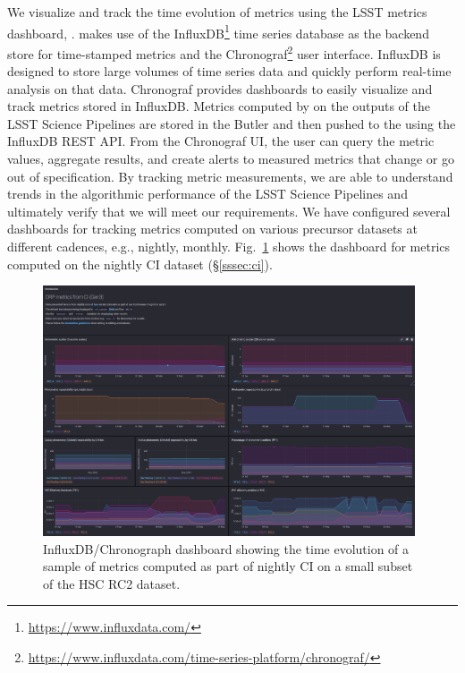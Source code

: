 We visualize and track the time evolution of \faro metrics using the LSST metrics dashboard, \squash\cite{SQR-009}.
\squash makes use of the InfluxDB\footnote{\url{https://www.influxdata.com/}} time series database as the backend store for time-stamped metrics and the Chronograf\footnote{\url{https://www.influxdata.com/time-series-platform/chronograf/}} user interface.
InfluxDB is designed to store large volumes of time series data and quickly perform real-time analysis on that data.
Chronograf provides dashboards to easily visualize and track metrics stored in InfluxDB.
Metrics computed by \faro on the outputs of the LSST Science Pipelines are stored in the Butler and then pushed to the \squash using the InfluxDB REST API.
From the Chronograf UI, the user can query the metric values, aggregate results, and create alerts to measured metrics that change or go out of specification.
By tracking metric measurements, we are able to understand trends in the algorithmic performance of the LSST Science Pipelines and ultimately verify that we will meet our requirements.
We have configured several dashboards for tracking \faro metrics computed on various precursor datasets at different cadences, e.g., nightly, monthly.
Fig.~\ref{fig:squash_metrics_ci} shows the dashboard for \faro metrics computed on the nightly CI dataset (\S \ref{sssec:ci}). 
\begin{figure}[ht]
  \par\medskip 
  \centering
  \includegraphics[width=0.98\textwidth]{figures/squash-dashboard-ci.png}
  \par\medskip   
  \caption{\label{fig:squash_metrics_ci} 
  InfluxDB/Chronograph dashboard showing the time evolution of a sample of metrics computed as part of nightly CI on a small subset of the HSC RC2 dataset.}
\end{figure}

